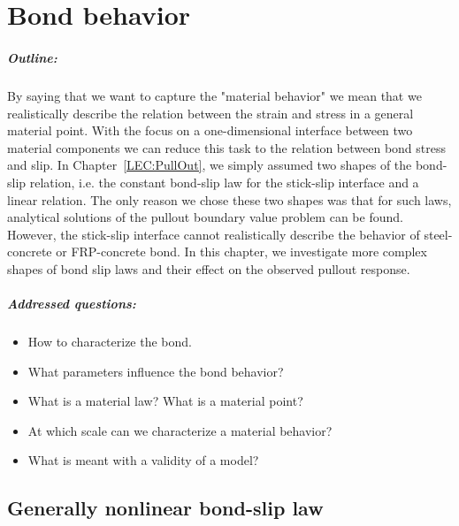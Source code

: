 \documentclass[main.tex]{subfiles}
\begin{document}
\chapter{Bond behavior}
\label{LEC:BondBehavior}

\paragraph{Outline:}
By saying that we want to capture the "material behavior" we mean that we realistically describe the relation 
between the strain and stress in a general material point. With the focus on a one-dimensional interface between two material components we can reduce this task to the relation between bond stress and slip. In Chapter~\ref{LEC:PullOut}, we simply assumed two shapes of the bond-slip relation, i.e. the constant bond-slip law for the stick-slip interface and a linear relation. The only reason we chose these two shapes was that for such laws, analytical solutions of the pullout boundary value problem can be found. However, the stick-slip interface cannot realistically describe the behavior of steel-concrete or FRP-concrete bond. 
In this chapter, we investigate more complex shapes of bond slip laws and their effect on the observed pullout response.

\paragraph{Addressed questions:}
\begin{itemize}
    \item 
How to characterize the bond.     \item 
What parameters influence the bond behavior? 
    \item 
What is a material law? What is a material point? 
    \item 
At which scale can we characterize a material behavior? 
    \item 
What is meant with a validity of a model?
\end{itemize}

\section{Generally nonlinear bond-slip law}
\label{SEC:gen_nonlinear_bs_law}
\end{document}
